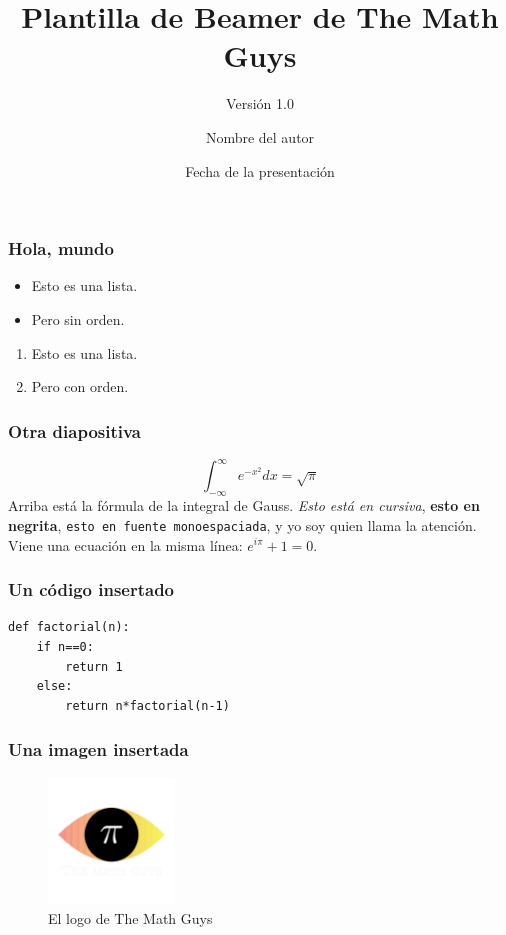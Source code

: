 \documentclass[aspectratio=169]{beamer}
\title{Plantilla de Beamer de The Math Guys}
\subtitle{Versión 1.0}
\author{Nombre del autor}
\date{Fecha de la presentación}
\institute{Nombre del rol de The Math Guys}
\begin{document}
\begin{frame}
  \titlepage
\end{frame}
\begin{frame}
  \frametitle{Hola, mundo}
  \begin{itemize}
    \item Esto es una lista.
    \item Pero sin orden.
  \end{itemize}
  \begin{enumerate}
    \item Esto es una lista.
    \item Pero con orden.
  \end{enumerate}
\end{frame}
\begin{frame}
  \frametitle{Otra diapositiva}
  $$\int_{-\infty}^{\infty}e^{-x^2}dx=\sqrt{\pi}$$
  Arriba está la fórmula de la integral de Gauss. \textit{Esto está en cursiva}, \textbf{esto en negrita}, \texttt{esto en fuente monoespaciada}, \alert{y yo soy quien llama la atención}.
  Viene una ecuación en la misma línea: $e^{i\pi}+1=0$.
\end{frame}
\begin{frame}[fragile]
  \frametitle{Un código insertado}
  \begin{verbatim}
def factorial(n):
    if n==0:
        return 1
    else:
        return n*factorial(n-1)
  \end{verbatim}
\end{frame}
\begin{frame}
  \frametitle{Una imagen insertada}
  \begin{figure}
    \centering
    \includegraphics[width=0.3\textwidth]{TheMathGuysLogo.png}
    \caption{El logo de The Math Guys}
  \end{figure}
\end{frame}
\end{document}
